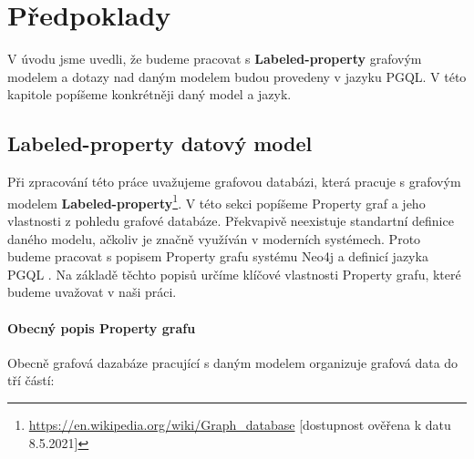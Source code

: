 \chapter{Předpoklady}
\label{requirements}

V úvodu jsme uvedli, že budeme pracovat s \textbf{Labeled-property} grafovým modelem a dotazy nad daným modelem budou provedeny v jazyku PGQL.
V této kapitole popíšeme konkrétněji daný model a jazyk.

\section{Labeled-property datový model}
\label{req.propGraph}

Při zpracování této práce uvažujeme grafovou databázi, která pracuje s grafovým modelem \textbf{Labeled-property}\footnote{\url{https://en.wikipedia.org/wiki/Graph_database} [dostupnost ověřena k datu 8.5.2021]}.
V této sekci popíšeme Property graf a jeho vlastnosti z pohledu grafové databáze.
Překvapivě neexistuje standartní definice daného modelu, ačkoliv je značně využíván v moderních systémech.
Proto budeme pracovat s popisem Property grafu systému Neo4j \citep{neopropertygraph} a definicí jazyka PGQL \citep{pgql}.
Na základě těchto popisů určíme klíčové vlastnosti Property grafu, které budeme uvažovat v naši práci.

\subsubsection{Obecný popis Property grafu}
Obecně grafová dazabáze pracující s daným modelem organizuje grafová data do tří částí:

